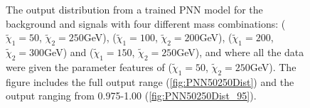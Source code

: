 \begin{figure}
    \caption[The output distribution from a trained \acs{PNN} model for the background and signals with four different mass combinations, where 
    all events are given the same parameter.]{The output distribution from a trained \ac{PNN} model for the background and signals with four different 
    mass combinations: ($\tilde{\chi}_1=50$, $\tilde{\chi}_2=250$GeV), ($\tilde{\chi}_1=100$, $\tilde{\chi}_2=200$GeV), 
    ($\tilde{\chi}_1=200$, $\tilde{\chi}_2=300$GeV) and ($\tilde{\chi}_1=150$, $\tilde{\chi}_2=250$GeV), and where all the data were given the 
    parameter features of ($\tilde{\chi}_1=50$, $\tilde{\chi}_2=250$GeV). The figure includes the full output range (\ref{fig:PNN50250Dist}) 
    and the output ranging from 0.975-1.00 (\ref{fig:PNN50250Dist_95}).}
    \label{fig:PNN50250}
\end{figure}
